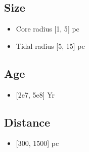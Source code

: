 \documentclass[letterpaper,10pt,english]{sphinxmanual}
\begin{document}
\subsection{Size}
\label{\detokenize{Project_Overview/MilkyWayClusters:size}}\begin{itemize}
\item {} 
\sphinxAtStartPar
Core radius {[}1, 5{]} pc

\item {} 
\sphinxAtStartPar
Tidal radius {[}5, 15{]} pc

\end{itemize}


\subsection{Age}
\label{\detokenize{Project_Overview/MilkyWayClusters:age}}\begin{itemize}
\item {} 
\sphinxAtStartPar
{[}2e7, 5e8{]} Yr

\end{itemize}


\subsection{Distance}
\label{\detokenize{Project_Overview/MilkyWayClusters:distance}}\begin{itemize}
\item {} 
\sphinxAtStartPar
{[}300, 1500{]} pc

\end{itemize}
\end{document}
